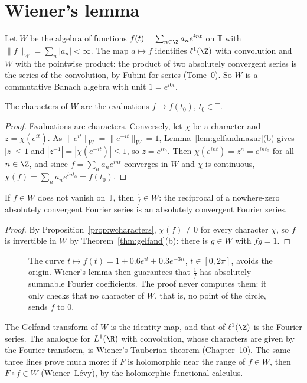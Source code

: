 \section{Wiener's lemma}

Let $W$ be the algebra of functions $f(t)=\sum_{n\in\Z}a_ne^{int}$ on $\mathbb T$ with $\|f\|_W=\sum_n|a_n|<\infty$. The map $a\mapsto f$ identifies $\ell^1(\Z)$ with convolution and $W$ with the pointwise product: the product of two
absolutely convergent series is the series of the convolution, by Fubini for series (Tome~0). So $W$ is a commutative Banach algebra with unit $1=e^{i0t}$.

\begin{proposition}\label{prop:wcharacters}
The characters of $W$ are the evaluations $f\mapsto f(t_0)$, $t_0\in\mathbb T$.
\end{proposition}
\begin{proof}
Evaluations are characters. Conversely, let $\chi$ be a character and $z=\chi(e^{it})$. As $\|e^{it}\|_W=\|e^{-it}\|_W=1$, Lemma~\ref{lem:gelfandmazur}(b) gives $|z|\le1$ and $|z^{-1}|=|\chi(e^{-it})|\le1$, so $z=e^{it_0}$. Then
$\chi(e^{int})=z^n=e^{int_0}$ for all $n\in\Z$, and since $f=\sum_na_ne^{int}$ converges in $W$ and $\chi$ is continuous, $\chi(f)=\sum_na_ne^{int_0}=f(t_0)$.
\end{proof}

\begin{theorem}\label{thm:wiener}
If $f\in W$ does not vanish on $\mathbb T$, then $\frac1f\in W$: the reciprocal of a nowhere-zero absolutely convergent Fourier series is an absolutely convergent Fourier series.
\end{theorem}
\begin{proof}
By Proposition~\ref{prop:wcharacters}, $\chi(f)\ne0$ for every character $\chi$, so $f$ is invertible in $W$ by Theorem~\ref{thm:gelfand}(b): there is $g\in W$ with $fg=1$.
\end{proof}

\begin{figure}[ht]
\centering
{}
\caption{The curve $t\mapsto f(t)=1+0.6e^{it}+0.3e^{-3it}$, $t\in[0,2\pi]$, avoids the origin. Wiener's lemma then guarantees that $\frac1f$ has absolutely summable Fourier coefficients. The proof never computes them: it only checks
that no character of $W$, that is, no point of the circle, sends $f$ to $0$.}
\label{fig:wiener}
\end{figure}

The Gelfand transform of $W$ is the identity map, and that of $\ell^1(\Z)$ is the Fourier series. The analogue for $L^1(\R)$ with convolution, whose characters are given by the Fourier transform, is Wiener's Tauberian theorem
(Chapter~10). The same three lines prove much more: if $F$ is holomorphic near the range of $f\in W$, then $F\circ f\in W$ (Wiener--L\'evy), by the holomorphic functional calculus.

